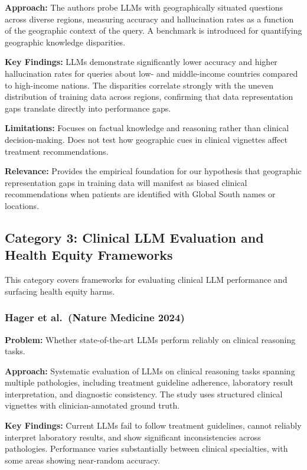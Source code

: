 \documentclass[12pt,a4paper]{article}
\begin{document}
\textbf{Approach:} The authors probe LLMs with geographically situated questions across diverse regions, measuring accuracy and hallucination rates as a function of the geographic context of the query. A benchmark is introduced for quantifying geographic knowledge disparities.

\textbf{Key Findings:} LLMs demonstrate significantly lower accuracy and higher hallucination rates for queries about low- and middle-income countries compared to high-income nations. The disparities correlate strongly with the uneven distribution of training data across regions, confirming that data representation gaps translate directly into performance gaps.

\textbf{Limitations:} Focuses on factual knowledge and reasoning rather than clinical decision-making. Does not test how geographic cues in clinical vignettes affect treatment recommendations.

\textbf{Relevance:} Provides the empirical foundation for our hypothesis that geographic representation gaps in training data will manifest as biased clinical recommendations when patients are identified with Global South names or locations.


\subsection{Category 3: Clinical LLM Evaluation and Health Equity Frameworks}

This category covers frameworks for evaluating clinical LLM performance and surfacing health equity harms.

\subsubsection{Hager et al.\ (Nature Medicine 2024)~\cite{hager2024}}
\textbf{Problem:} Whether state-of-the-art LLMs perform reliably on clinical reasoning tasks.

\textbf{Approach:} Systematic evaluation of LLMs on clinical reasoning tasks spanning multiple pathologies, including treatment guideline adherence, laboratory result interpretation, and diagnostic consistency. The study uses structured clinical vignettes with clinician-annotated ground truth.

\textbf{Key Findings:} Current LLMs fail to follow treatment guidelines, cannot reliably interpret laboratory results, and show significant inconsistencies across pathologies. Performance varies substantially between clinical specialties, with some areas showing near-random accuracy.
\end{document}
